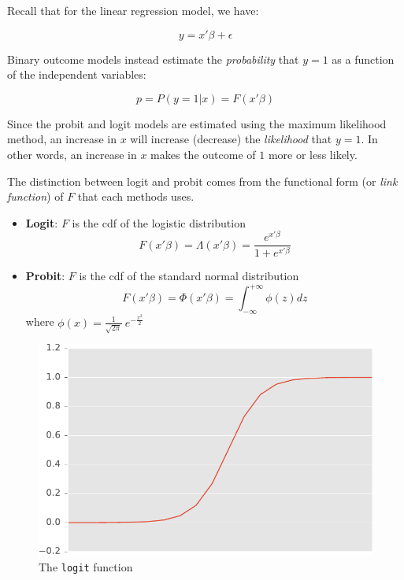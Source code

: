 Recall that for the linear regression model, we have:

\begin{equation}
    y = x'\beta + \epsilon
\end{equation}

Binary outcome models instead estimate the \textit{probability} that $y=1$ as a function of the independent variables:

\begin{equation}
    p = P(y=1 | x) = F(x'\beta)
\end{equation}

Since the probit and logit models are estimated using the maximum likelihood method, an increase in $x$ will increase (decrease) the \textit{likelihood} that $y=1$. In other words, an increase in $x$ makes the outcome of $1$ more or less likely.

The distinction between logit and probit comes from the functional form (or \textit{link function}) of $F$ that each methods uses.

\begin{itemize}
    \item \textbf{Logit}: $F$ is the cdf of the logistic distribution
    $$ F(x'\beta) = \Lambda(x'\beta) = \frac{e^{x'\beta}}{1+e^{x'\beta}} $$

    \item \textbf{Probit}: $F$ is the cdf of the standard normal distribution
    $$ F(x'\beta) = \Phi(x'\beta) = \int_{-\infty}^{+\infty} \phi(z)dz $$
    where $\phi(x) = \frac{1}{\sqrt{2\pi}}\ e^{-\frac{x^2}{2}}$
\end{itemize}

\begin{figure}[!ht]
    \centering
    \includegraphics{img/logit_function.pdf}
    \caption{The \texttt{logit} function}
    \label{fig:logit_function}
\end{figure}

